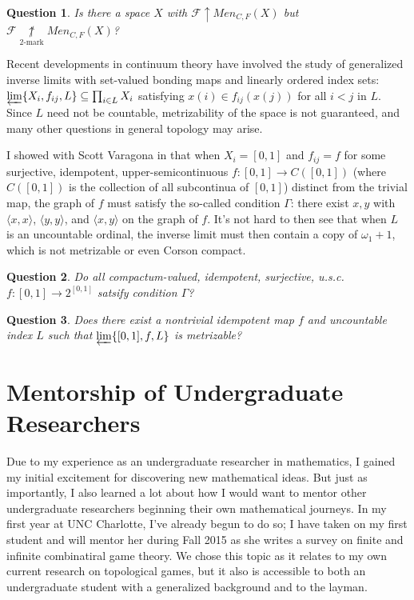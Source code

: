 \documentclass[11pt]{amsart}
\theoremstyle{plain}
\newtheorem{question}{Question}
\newcommand{\win}{\uparrow}
\newcommand{\notkmarkwin}[1]{\underset{#1\text{-mark}}{\not\uparrow}}
\newcommand{\menGame}[1]{Men_{C,F}(#1)}
\newcommand{\<}{\langle}
\renewcommand{\>}{\rangle}
\newcommand{\pl}[1]{\mathscr{#1}}
\begin{document}
\begin{question}
  Is there a space $X$ with $\pl F\win\menGame{X}$ but
  $\pl F\notkmarkwin{2}\menGame{X}$?
\end{question}

Recent developments in continuum theory have involved the study of generalized
inverse limits with set-valued bonding maps and linearly ordered index sets:
$\varprojlim \{X_i,f_{ij},L\}\subseteq \prod_{i\in L}X_i$ satisfying
$x(i)\in f_{ij}(x(j))$ for all $i<j$ in $L$. Since $L$ need not
be countable, metrizability of the space is not guaranteed, and many
other questions in general topology may arise.

I showed
with Scott Varagona in \cite{destroyMetrizability} that when
$X_i=[0,1]$ and $f_{ij}=f$ for some surjective,
idempotent, upper-semicontinuous
$f:[0,1]\to C([0,1])$ (where $C([0,1])$ is the collection of all subcontinua
of $[0,1]$) distinct from the trivial map,
the graph of $f$ must satisfy the so-called condition
$\Gamma$: there exist $x,y$ with $\<x,x\>$, $\<y,y\>$, and $\<x,y\>$ on
the graph of $f$.
It's not hard to then see that when $L$ is an uncountable ordinal,
the inverse limit must then contain a copy of $\omega_1+1$, which
is not metrizable or even Corson compact.

\begin{question}
  Do all compactum-valued, idempotent, surjective, u.s.c. $f:[0,1]\to 2^{[0,1]}$
  satsify condition $\Gamma$?
\end{question}

\begin{question}
  Does there exist a nontrivial idempotent map $f$ and uncountable index $L$
  such that $\varprojlim \{[0,1],f,L\}$ is metrizable?
\end{question}

\section*{Mentorship of Undergraduate Researchers}

Due to my experience as an undergraduate researcher in mathematics, I gained
my initial excitement for discovering new mathematical ideas. But just as
importantly, I also learned a lot about how I would want to mentor other
undergraduate researchers beginning their own mathematical journeys. In my
first year at UNC Charlotte, I've already begun to do so; I have taken
on my first student and will mentor her during Fall 2015
as she writes a survey on finite and infinite combinatiral game theory. We
chose this topic as it relates to my own current research on topological
games, but it also is accessible to both an undergraduate student with a
generalized background and to the layman.
\end{document}
